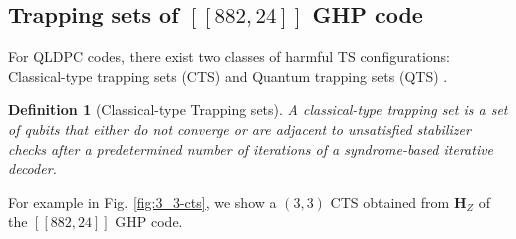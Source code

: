\documentclass[%
 reprint,
 amsmath,amssymb,
 aps,
pra,
showkeys,
]{revtex4-2}
\newtheorem{definition}{Definition}[section]
\begin{document}
\subsection{Trapping sets of $[[882,24]]$ GHP code}
For QLDPC codes, there exist two classes of harmful TS configurations: Classical-type trapping sets (CTS) and Quantum trapping sets (QTS) \cite{raveendran2021trapping}.
\begin{definition}[Classical-type Trapping sets]
    \label{def:classical trapping set}
    A classical-type trapping set is a set of qubits that either do not converge or
    are adjacent to unsatisfied stabilizer checks after a predetermined number of iterations of a syndrome-based iterative decoder.
\end{definition}
For example in Fig. \ref{fig:3_3-cts}, we show a $(3,3)$ CTS obtained from $\mathbf{H}_Z$ of the $[[882,24]]$ GHP code.
\end{document}
